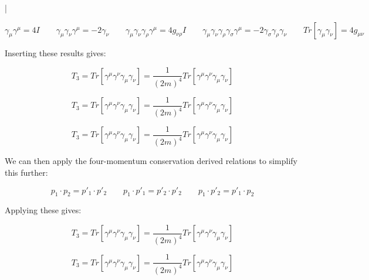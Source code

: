 \documentclass[a4]{article}
\begin{document}
    \begin{framed}
        |
    \end{framed}

    \begin{equation}
        \gamma_\mu \gamma^\mu = 4 I \qquad \gamma_\mu \gamma_\nu \gamma^\mu = - 2 \gamma_\nu \qquad \gamma_\mu \gamma_\nu \gamma_\rho \gamma^\mu = 4 g_{\nu \rho} I \qquad \gamma_\mu \gamma_\nu \gamma_\rho \gamma_\sigma \gamma^\mu = - 2 \gamma_\sigma \gamma_\rho \gamma_\nu \qquad Tr [\gamma_\mu \gamma_\nu] = 4 g_{\mu \nu}
    \end{equation}


    Inserting these results gives: 

    \begin{equation}
        T_3 = Tr [\gamma^\mu \gamma^\nu \gamma_\mu \gamma_\nu] = \frac{1}{(2 m)^4} Tr [\gamma^\mu \gamma^\nu \gamma_\mu \gamma_\nu]
    \end{equation}

    \begin{equation}
        T_3 = Tr [\gamma^\mu \gamma^\nu \gamma_\mu \gamma_\nu] = \frac{1}{(2 m)^4} Tr [\gamma^\mu \gamma^\nu \gamma_\mu \gamma_\nu]
    \end{equation}

    \begin{equation}
        T_3 = Tr [\gamma^\mu \gamma^\nu \gamma_\mu \gamma_\nu] = \frac{1}{(2 m)^4} Tr [\gamma^\mu \gamma^\nu \gamma_\mu \gamma_\nu]
    \end{equation}

    We can then apply the four-momentum conservation derived relations to simplify this further:

    \begin{equation}
        p_1 \cdot p_2 = p'_1 \cdot p'_2 \qquad p_1 \cdot p'_1 = p'_2 \cdot p'_2 \qquad p_1 \cdot p'_2 = p'_1 \cdot p_2
    \end{equation}

    Applying these gives:

    \begin{equation}
        T_3 = Tr [\gamma^\mu \gamma^\nu \gamma_\mu \gamma_\nu] = \frac{1}{(2 m)^4} Tr [\gamma^\mu \gamma^\nu \gamma_\mu \gamma_\nu]
    \end{equation}

    \begin{equation}
        T_3 = Tr [\gamma^\mu \gamma^\nu \gamma_\mu \gamma_\nu] = \frac{1}{(2 m)^4} Tr [\gamma^\mu \gamma^\nu \gamma_\mu \gamma_\nu]
    \end{equation}
\end{document}
